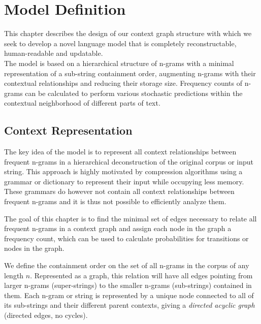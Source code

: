 \chapter{Model Definition}\label{chp:model}

This chapter describes the design of our context graph structure with which we seek to develop a novel language model that is completely reconstructable, human-readable and updatable.\\
The model is based on a hierarchical structure of n-grams with a minimal representation of a sub-string containment order, augmenting n-grams with their contextual relationships and reducing their storage size. Frequency counts of n-grams can be calculated to perform various stochastic predictions within the contextual neighborhood of different parts of text.


\section{Context Representation}
The key idea of the model is to represent all context relationships between frequent n-grams in a hierarchical deconstruction of the original corpus or input string. This approach is highly motivated by compression algorithms using a grammar or dictionary to represent their input while occupying less memory. These grammars do however not contain all context relationships between frequent n-grams and it is thus not possible to efficiently analyze them.\par

\noindent
The goal of this chapter is to find the minimal set of edges necessary to relate all frequent n-grams in a context graph and assign each node in the graph a frequency count, which can be used to calculate probabilities for transitions or nodes in the graph.

\noindent
We define the containment order on the set of all n-grams in the corpus of any length $n$. Represented as a graph, this relation will have all edges pointing from larger n-grams (super-strings) to the smaller n-grams (sub-strings) contained in them. Each n-gram or string is represented by a unique node connected to all of its sub-strings and their different parent contexts, giving a \emph{directed acyclic graph} (directed edges, no cycles).

